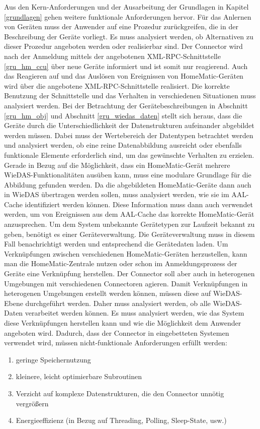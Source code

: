 Aus den Kern-Anforderungen und der Ausarbeitung der Grundlagen in Kapitel \ref{grundlagen}
gehen weitere funktionale Anforderungen hervor.
Für das Anlernen von Geräten muss der Anwender auf eine Prozedur zurückgreifen, die in
der Beschreibung der Geräte vorliegt.
Es muss analysiert werden, ob Alternativen zu dieser Prozedur angeboten werden oder
realisierbar sind.
Der Connector wird nach der Anmeldung mittels der angebotenen XML-RPC-Schnittstelle
\ref{gru_hm_ccu} über neue Geräte informiert und ist somit nur reagierend.
Auch das Reagieren auf und das Auslösen von Ereignissen von HomeMatic-Geräten wird
über die angebotene XML-RPC-Schnittstelle realisiert.
Die korrekte Benutzung der Schnittstelle und das Verhalten in verschiedenen Situationen
muss analysiert werden.
Bei der Betrachtung der Gerätebeschreibungen in Abschnitt \ref{gru_hm_obj} und Abschnitt
\ref{gru_wiedas_daten} stellt sich heraus, dass die Geräte durch die Unterschiedlichkeit
der Datenstrukturen aufeinander abgebildet werden müssen.
Dabei muss der Wertebereich der Datentypen betrachtet werden und analysiert werden, ob
eine reine Datenabbildung ausreicht oder ebenfalls funktionale Elemente erforderlich sind,
um das gewünschte Verhalten zu erzielen.
Gerade in Bezug auf die Möglichkeit, dass ein HomeMatic-Gerät mehrere WieDAS-Funktionalitäten
ausüben kann, muss eine modulare Grundlage für die Abbildung gefunden werden.
Da die abgebildeten HomeMatic-Geräte dann auch in WieDAS übertragen werden sollen,
muss analysiert werden, wie sie im AAL-Cache identifiziert werden können.
Diese Information muss dann auch verwendet werden, um von Ereignissen aus dem AAL-Cache
das korrekte HomeMatic-Gerät anzusprechen.
Um dem System unbekannte Gerätetypen zur Laufzeit bekannt zu geben, benötigt es einer Geräteverwaltung.
Die Geräteverwaltung muss in diesem Fall benachrichtigt werden und entsprechend die Gerätedaten laden.
Um Verknüpfungen zwischen verschiedenen HomeMatic-Geräten herzustellen, kann man die
HomeMatic-Zentrale nutzen oder schon im Anmeldungsprozess der Geräte eine Verknüpfung herstellen.
Der Connector soll aber auch in heterogenen Umgebungen mit verschiedenen Connectoren
agieren.
Damit Verknüpfungen in heterogenen Umgebungen erstellt werden können, müssen diese
auf WieDAS-Ebene durchgeführt werden.
Daher muss analysiert werden, ob alle WieDAS-Daten verarbeitet werden können.
Es muss analysiert werden, wie das System diese Verknüpfungen herstellen kann und wie die
Möglichkeit dem Anwender angeboten wird.
Dadurch, dass der Connector in eingebetteten Systemen verwendet wird, müssen nicht-funktionale Anforderungen erfüllt werden:
\begin{enumerate}
\item geringe Speichernutzung
\item kleinere, leicht optimierbare Subroutinen
\item Verzicht auf komplexe Datenstrukturen, die den Connector unnötig vergrößern
\item Energieeffizienz (in Bezug auf Threading, Polling, Sleep-State, usw.)
\end{enumerate}

